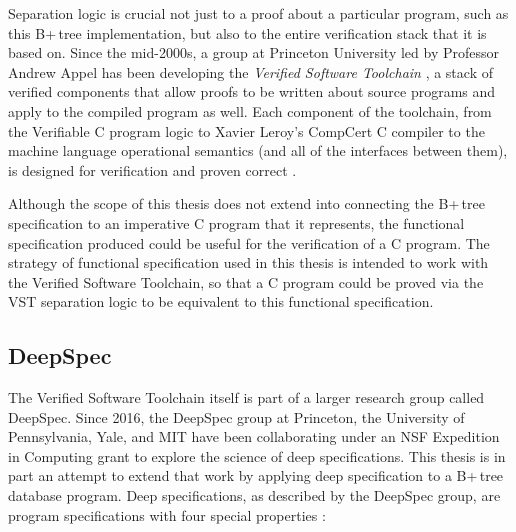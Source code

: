 \documentclass[12pt]{article}
\begin{document}
Separation logic is crucial not just to a proof about a particular program, such as this B+\,tree implementation, but also to the entire verification stack that it is based on. Since the mid-2000s, a group at Princeton University led by Professor Andrew Appel has been developing the \textit{Verified Software Toolchain} \cite{vst_2017}, a stack of verified components that allow proofs to be written about source programs and apply to the compiled program as well. Each component of the toolchain, from the Verifiable C program logic to Xavier Leroy’s CompCert C compiler to the machine language operational semantics (and all of the interfaces between them), is designed for verification and proven correct \cite{10.1007/978-3-642-19718-5_1}.

Although the scope of this thesis does not extend into connecting the B+\,tree specification to an imperative C program that it represents, the functional specification produced could be useful for the verification of a C program. The strategy of functional specification used in this thesis is intended to work with the Verified Software Toolchain, so that a C program could be proved via the VST separation logic to be equivalent to this functional specification.

\subsection{DeepSpec}
\label{subsec:deepspec}

The Verified Software Toolchain itself is part of a larger research group called DeepSpec. Since 2016, the DeepSpec group at Princeton, the University of Pennsylvania, Yale, and MIT have been collaborating under an NSF Expedition in Computing grant to explore the science of deep specifications. This thesis is in part an attempt to extend that work by applying deep specification to a B+\,tree database program. Deep specifications, as described by the DeepSpec group, are program specifications with four special properties \cite{deepspec}:
\end{document}
